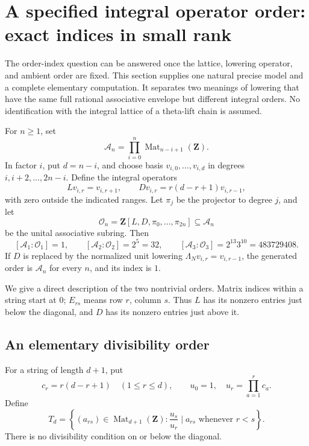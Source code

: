 \section{A specified integral operator order: exact indices in small rank}
\label{sec:order}

The order-index question can be answered once the lattice, lowering
operator, and ambient order are fixed.  This section supplies one
natural precise model and a complete elementary computation.  It
separates two meanings of lowering that have the same full rational
associative envelope but different integral orders.  No identification
with the integral lattice of a theta-lift chain is assumed.

\begin{theorem}
\label{sl:order}
For \(n\ge1\), set
\[
\mathcal A_n=\prod_{i=0}^n
  \operatorname{Mat}_{n-i+1}(\mathbf Z).
\]
In factor \(i\), put \(d=n-i\), and choose basis
\(v_{i,0},\ldots,v_{i,d}\) in degrees
\(i,i+2,\ldots,2n-i\).  Define the integral operators
\[
L v_{i,r}=v_{i,r+1},\qquad
D v_{i,r}=r(d-r+1)v_{i,r-1},
\]
with zero outside the indicated ranges.  Let \(\pi_j\) be the
projector to degree \(j\), and let
\[
\mathcal O_n=\mathbf Z[L,D,\pi_0,\ldots,\pi_{2n}]
\subseteq\mathcal A_n
\]
be the unital associative subring.  Then
\[
[\mathcal A_1:\mathcal O_1]=1,\qquad
[\mathcal A_2:\mathcal O_2]=2^5=32,\qquad
[\mathcal A_3:\mathcal O_3]=2^{13}3^{10}=483729408.
\]
If \(D\) is replaced by the normalized unit lowering
\(\Lambda_N v_{i,r}=v_{i,r-1}\), the generated order is
\(\mathcal A_n\) for every \(n\), and its index is \(1\).
\end{theorem}

We give a direct description of the two nontrivial orders.  Matrix
indices within a string start at \(0\); \(E_{rs}\) means row \(r\),
column \(s\).  Thus \(L\) has its nonzero entries just below the
diagonal, and \(D\) has its nonzero entries just above it.

\subsection{An elementary divisibility order}

For a string of length \(d+1\), put
\[
c_r=r(d-r+1)\quad(1\le r\le d),\qquad
u_0=1,\quad u_r=\prod_{a=1}^r c_a.
\]
Define
\[
T_d=\left\{(a_{rs})\in\operatorname{Mat}_{d+1}(\mathbf Z):
       \frac{u_s}{u_r}\mid a_{rs}\text{ whenever }r<s\right\}.
\]
There is no divisibility condition on or below the diagonal.

